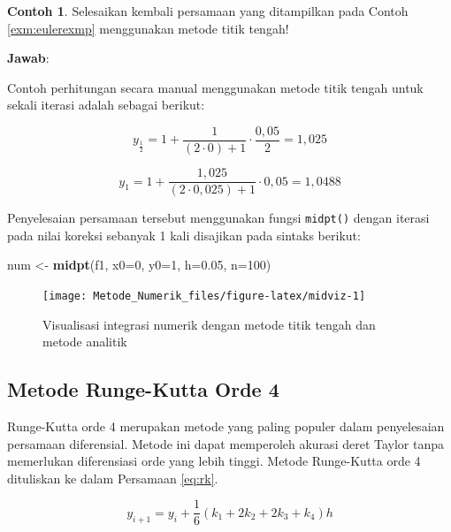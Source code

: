 \documentclass[
]{book}
\newenvironment{Shaded}{\begin{snugshade}}{\end{snugshade}}
\newcommand{\AttributeTok}[1]{\textcolor[rgb]{0.13,0.29,0.53}{#1}}
\newcommand{\DecValTok}[1]{\textcolor[rgb]{0.00,0.00,0.81}{#1}}
\newcommand{\FloatTok}[1]{\textcolor[rgb]{0.00,0.00,0.81}{#1}}
\newcommand{\FunctionTok}[1]{\textcolor[rgb]{0.13,0.29,0.53}{\textbf{#1}}}
\newcommand{\NormalTok}[1]{#1}
\newcommand{\OtherTok}[1]{\textcolor[rgb]{0.56,0.35,0.01}{#1}}
\theoremstyle{definition}
\theoremstyle{definition}
\newtheorem{example}{Contoh}[chapter]
\theoremstyle{definition}
\theoremstyle{definition}
\theoremstyle{remark}
\begin{document}
\begin{example}
\protect\hypertarget{exm:midexmp}{}\label{exm:midexmp}Selesaikan kembali persamaan yang ditampilkan pada Contoh \ref{exm:eulerexmp} menggunakan metode titik tengah!
\end{example}

\textbf{Jawab}:

Contoh perhitungan secara manual menggunakan metode titik tengah untuk sekali iterasi adalah sebagai berikut:

\[
y_{\frac{1}{2}}=1+\frac{1}{\left(2\cdot 0\right)+1}\cdot\frac{0,05}{2}=1,025
\]

\[
y_{1}=1+\frac{1,025}{\left(2\cdot 0,025\right)+1}\cdot0,05=1,0488
\]

Penyelesaian persamaan tersebut menggunakan fungsi \texttt{midpt()} dengan iterasi pada nilai koreksi sebanyak 1 kali disajikan pada sintaks berikut:

\begin{Shaded}
\begin{Highlighting}[]
\NormalTok{num }\OtherTok{\textless{}{-}} \FunctionTok{midpt}\NormalTok{(f1, }\AttributeTok{x0=}\DecValTok{0}\NormalTok{, }\AttributeTok{y0=}\DecValTok{1}\NormalTok{, }\AttributeTok{h=}\FloatTok{0.05}\NormalTok{, }\AttributeTok{n=}\DecValTok{100}\NormalTok{)}
\end{Highlighting}
\end{Shaded}

\begin{figure}

{\centering \texttt{[image: Metode\_Numerik\_files/figure-latex/midviz-1]} 

}

\caption{Visualisasi integrasi numerik dengan metode titik tengah dan metode analitik}\label{fig:midviz}
\end{figure}

\hypertarget{rungekutta}{%
\subsection{Metode Runge-Kutta Orde 4}\label{rungekutta}}

Runge-Kutta orde 4 merupakan metode yang paling populer dalam penyelesaian persamaan diferensial. Metode ini dapat memperoleh akurasi deret Taylor tanpa memerlukan diferensiasi orde yang lebih tinggi. Metode Runge-Kutta orde 4 dituliskan ke dalam Persamaan \eqref{eq:rk}.

\begin{equation}
y_{i+1}=y_i+\frac{1}{6}\left(k_1+2k_2+2k_3+k_4\right)h
  \label{eq:rk}
\end{equation}
\end{document}
